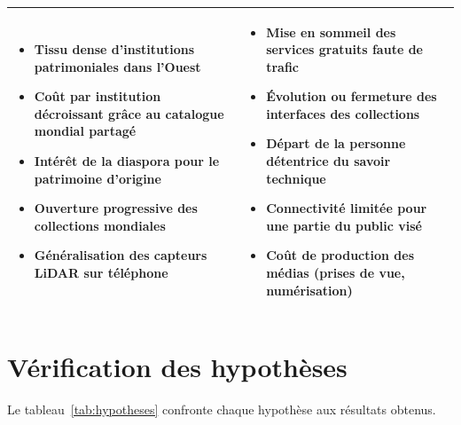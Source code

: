\begin{table}[htbp]
\begin{tabularx}{\textwidth}{|X|X|}
\begin{minipage}[t]{\linewidth}
\begin{itemize}[leftmargin=1.1em,topsep=0pt]
  \item Tissu dense d'institutions patrimoniales dans l'Ouest
  \item Coût par institution décroissant grâce au catalogue mondial partagé
  \item Intérêt de la diaspora pour le patrimoine d'origine
  \item Ouverture progressive des collections mondiales
  \item Généralisation des capteurs LiDAR sur téléphone
\end{itemize}\vspace{2pt}\end{minipage}
&
\begin{minipage}[t]{\linewidth}\vspace{2pt}
\begin{itemize}[leftmargin=1.1em,topsep=0pt]
  \item Mise en sommeil des services gratuits faute de trafic
  \item Évolution ou fermeture des interfaces des collections
  \item Départ de la personne détentrice du savoir technique
  \item Connectivité limitée pour une partie du public visé
  \item Coût de production des médias (prises de vue, numérisation)
\end{itemize}\vspace{2pt}\end{minipage} \\ \hline
\end{tabularx}
\end{table}

\section{Vérification des hypothèses}
\label{sec:verif}

Le tableau~\ref{tab:hypotheses} confronte chaque hypothèse aux résultats
obtenus.

